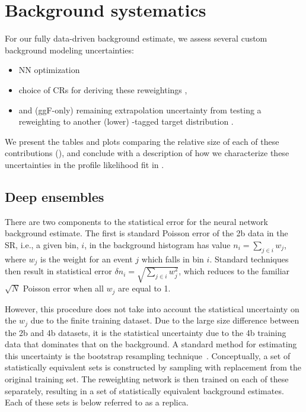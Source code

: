 \section{Background systematics}
\label{sec:bkg-systs}

For our fully data-driven background estimate, we assess several custom background modeling uncertainties: 
\begin{itemize}
	\itemsep0em 
	\item NN optimization \Sect{\ref{subsec:bootstrap}}
	\item choice of CRs for deriving these reweightings \Sect{\ref{subsec:shape}},
	\item and (ggF-only) remaining extrapolation uncertainty from testing a reweighting to another (lower) \Pqb-tagged target distribution \Sect{\ref{subsec:syst:3b1fnonclosure}}. 
\end{itemize}	

We present the tables and plots comparing the relative size of each of these contributions (\Sect{\ref{subsec:bkgUnc-summary}}), and conclude with a description of how we characterize these uncertainties in the profile likelihood fit in .


\subsection{Deep ensembles}
\label{subsec:bootstrap}

There are two components to the statistical error for the neural network
background estimate. The first is standard Poisson error of the 2b data in the SR, i.e., a given bin,
$i$, in the background histogram has value $n_i = \sum\limits_{j\in i} w_j$,
where $w_j$ is the weight for an event $j$ which falls in bin $i$. Standard
techniques then result in statistical error $\delta n_i =
	\sqrt{\sum\limits_{j\in i} w_j^2}$, which reduces to the familiar $\sqrt{N}$
Poisson error when all $w_j$ are equal to 1.

However, this procedure does not take into account the statistical uncertainty
on the $w_j$ due to the finite training dataset. Due to the large size
difference between the 2b and 4b datasets, it is the statistical
uncertainty due to the 4b training data that dominates that on the
background. A standard method for estimating this uncertainty is the bootstrap
resampling technique~\cite{Bootstrap}. Conceptually, a set of statistically
equivalent sets is constructed by sampling with replacement from the original
training set. The reweighting network is then trained on each of these
separately, resulting in a set of statistically equivalent background estimates.
Each of these sets is below referred to as a replica.

